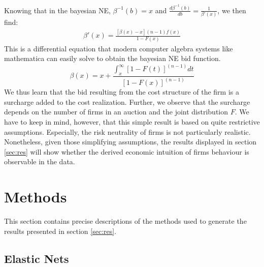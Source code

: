 \documentclass[a4paper,12pt, headsepline]{scrartcl}
\numberwithin{equation}{section}
\begin{document}
Knowing that in the bayesian NE, $\beta^{-1}(b) = x$ and $\frac{d\beta^{-1}(b)}{db} = \frac{1}{\beta'(x)}$, we then find:
\begin{gather*}
	\beta'(x) = \frac{[\beta(x) - x](n - 1)f(x)}{1-F(x)}
\end{gather*}
This is a differential equation that modern computer algebra systems like mathematica can easily solve to obtain the bayesian NE bid function.
\[
\beta(x) = x + \frac{\int_x^\infty [1 - F(t)]^{(n-1)}dt}{[1-F(x)]^{(n-1)}}
\]
We thus learn that the bid resulting from the cost structure of the firm is a surcharge added to the cost realization. Further, we observe that the surcharge depends on the number of firms in an auction and the joint distribution $F$. We have to keep in mind, however, that this simple result is based on quite restrictive assumptions. Especially, the risk neutrality of firms is not particularly realistic. Nonetheless, given those simplifying assumptions, the results displayed in section \ref{sec:res} will show whether the derived economic intuition of firms behaviour is observable in the data.
\section{Methods}\label{sec:meth}

This section contains precise descriptions of the methods used to generate the results presented in section \ref{sec:res}.

\subsection{Elastic Nets}\label{subsec:net}
\end{document}
